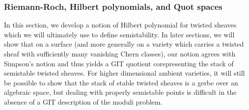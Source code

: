 \documentclass[11pt]{amsart}
\renewcommand{\[}{[\!\hspace{0.03em}[}
\renewcommand{\]}{]\!\hspace{0.03em}]}
\renewcommand{\(}{(\!\hspace{0.03em}(}
\renewcommand{\)}{)\!\hspace{0.03em})}
\theoremstyle{definition}
\theoremstyle{remark}
\begin{document}
\subsubsection{Riemann-Roch, Hilbert polynomials, and Quot spaces}\label{S:hilbert polynomials and quot spaces}
In this section, we develop a notion of Hilbert polynomial for twisted 
sheaves which we will ultimately use to define semistability.  In 
later sections, we will show that on a surface (and more generally on 
a variety which carries a twisted sheaf with sufficiently many vanishing Chern 
classes), our notion agrees with Simpson's notion \cite[\S3]{simpson} and thus yields a 
GIT quotient corepresenting the stack of semistable twisted sheaves.  For higher dimensional ambient varieties, 
it will still be possible to show that the stack of stable twisted 
sheaves is a gerbe over an algebraic space, but dealing with 
properly semistable points is difficult in the absence of a GIT description of the moduli problem.
\end{document}
